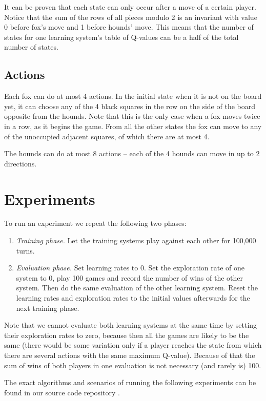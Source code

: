 \documentclass[a4paper]{article}
\begin{document}
It can be proven that each state can only occur after a move of a certain
player. Notice that the sum of the rows of all pieces modulo 2 is an invariant
with value 0 before fox's move and 1 before hounds' move. This means that the
number of states for one learning system's table of Q-values can be a half of
the total number of states.

\subsection{Actions}
Each fox can do at most 4 actions. In the initial state when it is not on the
board yet, it can choose any of the 4 black squares in the row on the side of
the board opposite from the hounds. Note that this is the only case when a fox
moves twice in a row, as it begins the game. From all the other states the fox
can move to any of the unoccupied adjacent squares, of which there are at most
4.

The hounds can do at most 8 actions -- each of the 4 hounds can move in up to 2
directions.

\section{Experiments}
To run an experiment we repeat the following two phases:
\begin{enumerate}
    \item {\em Training phase.} Let the training systems play against each other for
        100,000 turns.
    \item {\em Evaluation phase.} Set learning rates to 0. Set the exploration
        rate of one system to 0, play 100 games and record the number of wins
        of the other system. Then do the same evaluation of the other learning
        system. Reset the learning rates and exploration rates to the initial
        values afterwards for the next training phase.
\end{enumerate}

Note that we cannot evaluate both learning systems at the same time by setting
their exploration rates to zero, because then all the games are likely to be
the same (there would be some variation only if a player reaches the state from
which there are several actions with the same maximum Q-value). Because of that
the sum of wins of both players in one evaluation is not necessary (and rarely
is) 100.

The exact algorithms and scenarios of running the following experiments can be
found in our source code repository \cite{github}.
\end{document}
